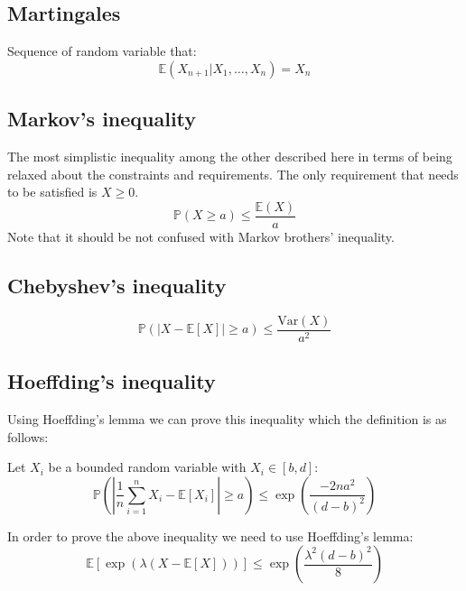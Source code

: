 \documentclass[a4paper,12pt]{article}
\begin{document}
\subsection{Martingales}
Sequence of random variable that:
\begin{equation}
    \mathbb { E } \left( X _ { n + 1 } | X _ { 1 } , \ldots , X _ { n } \right) = X _ { n }
\end{equation}

\subsection{Markov's inequality}
The most simplistic inequality among the other described here in terms of being relaxed about the constraints and requirements. The only requirement that needs to be satisfied is $X \geq 0$.
\begin{equation}
\mathbb {P}(X \geq a ) \leq \frac { \mathbb { E}( X ) } { a }
\end{equation}
Note that it should be not confused with Markov brothers' inequality.

\subsection{Chebyshev's inequality}
\begin{equation}
\mathbb {P}(|X - \mathbb{E}[X]| \geq a ) \leq \frac { \mathrm { Var}( X ) } { a^2 }
\end{equation}


\subsection{Hoeffding's inequality}
Using Hoeffding's lemma we can prove this inequality which the definition is as follows:

Let $X_i$ be a bounded random variable with $X_i \in [b, d]$:
\begin{equation}
    \mathbb {P} \left( \left| \frac{1}{n} \sum_{i=1}^{n} X_i - \mathbb{E}[X_i] \right| \geq a \right) \leq { \exp \left( \frac{-2 n a ^ {2} }{ \left(d-b \right) ^ 2} \right) }
\end{equation}

In order to prove the above inequality we need to use Hoeffding's lemma:
\begin{equation}
    \mathbb {E} \left[ \exp \left( {\lambda ( X - \mathbb {E}[X] )} \right)  \right] \leq \exp \left( \frac{\lambda ^ 2 (d-b)^2}{8} \right)
\end{equation}
\end{document}
